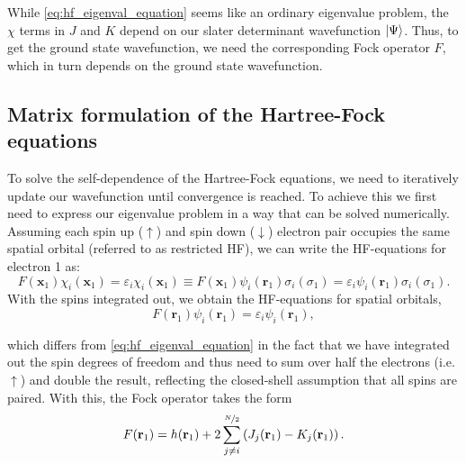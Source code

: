 While \autoref{eq:hf_eigenval_equation} seems like an ordinary eigenvalue problem, the $\chi$ terms in $J$ and $K$ depend on our slater determinant wavefunction $\ket{\Psi}$. Thus, to get the ground state wavefunction, we need the corresponding Fock operator $F$, which in turn depends on the ground state wavefunction. 


\subsection{Matrix formulation of the Hartree-Fock equations}
\label{subsec:background_hf_computational}
To solve the self-dependence of the Hartree-Fock equations, we need to iteratively update our wavefunction until convergence is reached. To achieve this we first need to express our eigenvalue problem in a way that can be solved numerically. Assuming each spin up ($\uparrow$) and spin down ($\downarrow$) electron pair occupies the same spatial orbital (referred to as restricted HF), we can write the HF-equations for electron 1 as:
\begin{equation}
    F(\mathbf{x}_1) \chi_i(\mathbf{x}_1) = \varepsilon_i \chi_i(\mathbf{x}_1) \equiv F(\mathbf{x}_1) \psi_i(\mathbf{r}_1) \sigma_i(\sigma_1) = \varepsilon_i \psi_i(\mathbf{r}_1) \sigma_i(\sigma_1).
\end{equation}
With the spins integrated out, we obtain the HF-equations for spatial orbitals, 
\begin{equation}
    \label{eq:hf_eigenval_equation_spatial}
    F(\mathbf{r}_1) \psi_i(\mathbf{r}_1) = \varepsilon_i \psi_i(\mathbf{r}_1),
\end{equation}

which differs from \autoref{eq:hf_eigenval_equation} in the fact that we have integrated out the spin degrees of freedom and thus need to sum over half the electrons (i.e. $\uparrow$) and double the result, reflecting the closed-shell assumption that all spins are paired. With this, the Fock operator takes the form 
\begin{equation}
    \label{eq:fock_operator_spatial}
    F(\mathbf{r}_1) = h(\mathbf{r}_1) + 2 \sum_{j\neq i}^{\nicefrac{N}{2}} \left( J_j(\mathbf{r}_1) - K_j(\mathbf{r}_1) \right).
\end{equation}

